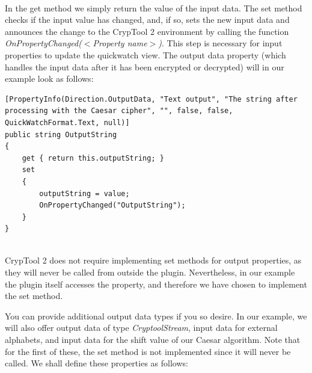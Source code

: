 \ \\
In the get method we simply return the value of the input data. The set method checks if the input value has changed, and, if so, sets the new input data and announces the change to the CrypTool 2 environment by calling the function \textit{OnPropertyChanged(\textit{$<$Property name$>$})}. This step is necessary for input properties to update the quickwatch view. The output data property (which handles the input data after it has been encrypted or decrypted) will in our example look as follows:


\begin{lstlisting}
[PropertyInfo(Direction.OutputData, "Text output", "The string after processing with the Caesar cipher", "", false, false, QuickWatchFormat.Text, null)]
public string OutputString
{
	get { return this.outputString; }
	set
	{
		outputString = value;
		OnPropertyChanged("OutputString");
	}
}
\end{lstlisting}

\ \\
\indent CrypTool 2 does not require implementing set methods for output properties, as they will never be called from outside the plugin. Nevertheless, in our example the plugin itself accesses the property, and therefore we have chosen to implement the set method.

You can provide additional output data types if you so desire. In our example, we will also offer output data of type \textit{CryptoolStream}, input data for external alphabets, and input data for the shift value of our Caesar algorithm. Note that for the first of these, the set method is not implemented since it will never be called. We shall define these properties as follows:

